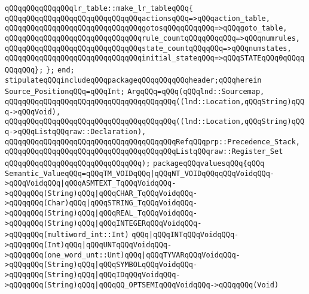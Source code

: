 \newline
\verb|qQQqqQQqqQQqqQQqlr_table::make_lr_tableqQQq{|\newline
\verb|qQQqqQQqqQQqqQQqqQQqqQQqqQQqqQQqactionsqQQq=>qQQqaction_table,|\newline
\verb|qQQqqQQqqQQqqQQqqQQqqQQqqQQqqQQqgotosqQQqqQQqqQQq=>qQQqgoto_table,|\newline
\verb|qQQqqQQqqQQqqQQqqQQqqQQqqQQqqQQqrule_countqQQqqQQqqQQq=>qQQqnumrules,|\newline
\verb|qQQqqQQqqQQqqQQqqQQqqQQqqQQqqQQqstate_countqQQqqQQq=>qQQqnumstates,|\newline
\verb|qQQqqQQqqQQqqQQqqQQqqQQqqQQqqQQqinitial_stateqQQq=>qQQqSTATEqQQq0qQQqqQQqqQQq};|\newline
\verb|};|\newline
\verb|end;|\newline
\verb|stipulateqQQqincludeqQQqpackageqQQqqQQqqQQqheader;qQQqherein|\newline
\verb|Source_PositionqQQq=qQQqInt;|\newline
\verb|ArgqQQq=qQQq(qQQqlnd::Sourcemap,|\newline
\verb|qQQqqQQqqQQqqQQqqQQqqQQqqQQqqQQqqQQqqQQq((lnd::Location,qQQqString)qQQq->qQQqVoid),|\newline
\verb|qQQqqQQqqQQqqQQqqQQqqQQqqQQqqQQqqQQqqQQq((lnd::Location,qQQqString)qQQq->qQQqListqQQqraw::Declaration),|\newline
\verb|qQQqqQQqqQQqqQQqqQQqqQQqqQQqqQQqqQQqqQQqRefqQQqprp::Precedence_Stack,|\newline
\verb|qQQqqQQqqQQqqQQqqQQqqQQqqQQqqQQqqQQqqQQqListqQQqraw::Register_Set|\newline
\verb|qQQqqQQqqQQqqQQqqQQqqQQqqQQqqQQq);|\newline
\verb|packageqQQqvaluesqQQq{qQQq|\newline
\verb|Semantic_ValueqQQq=qQQqTM_VOIDqQQq|\verb#|qQQqNT_VOIDqQQqqQQqVoidqQQq->qQQqVoidqQQq|qQQqASMTEXT_TqQQqVoidqQQq->qQQqqQQq(String)qQQq|qQQqCHAR_TqQQqVoidqQQq->qQQqqQQq(Char)qQQq|qQQqSTRING_TqQQqVoidqQQq->qQQqqQQq(String)qQQq|qQQqREAL_TqQQqVoidqQQq->qQQqqQQq(String)qQQq|qQQqINTEGERqQQqVoidqQQq->qQQqqQQq(multiword_int::Int)#\newline
\verb|qQQq|\verb#|qQQqINTqQQqVoidqQQq->qQQqqQQq(Int)qQQq|qQQqUNTqQQqVoidqQQq->qQQqqQQq(one_word_unt::Unt)qQQq|qQQqTYVARqQQqVoidqQQq->qQQqqQQq(String)qQQq|qQQqSYMBOLqQQqVoidqQQq->qQQqqQQq(String)qQQq|qQQqIDqQQqVoidqQQq->qQQqqQQq(String)qQQq|qQQqQQ_OPTSEMIqQQqVoidqQQq->qQQqqQQq(Void)#\newline
